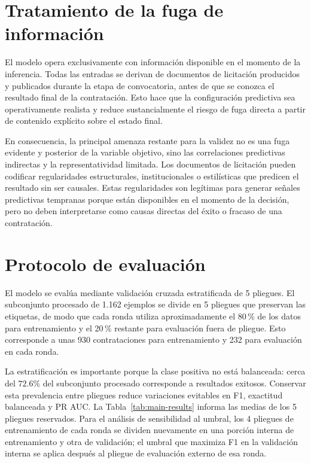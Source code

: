 \section{Tratamiento de la fuga de información}
El modelo opera exclusivamente con información disponible en el momento de la inferencia. Todas las entradas se derivan de documentos de licitación producidos y publicados durante la etapa de convocatoria, antes de que se conozca el resultado final de la contratación. Esto hace que la configuración predictiva sea operativamente realista y reduce sustancialmente el riesgo de fuga directa a partir de contenido explícito sobre el estado final.

En consecuencia, la principal amenaza restante para la validez no es una fuga evidente y posterior de la variable objetivo, sino las correlaciones predictivas indirectas y la representatividad limitada. Los documentos de licitación pueden codificar regularidades estructurales, institucionales o estilísticas que predicen el resultado sin ser causales. Estas regularidades son legítimas para generar señales predictivas tempranas porque están disponibles en el momento de la decisión, pero no deben interpretarse como causas directas del éxito o fracaso de una contratación.

\section{Protocolo de evaluación}
El modelo se evalúa mediante validación cruzada estratificada de 5 pliegues. El subconjunto procesado de 1.162 ejemplos se divide en 5 pliegues que preservan las etiquetas, de modo que cada ronda utiliza aproximadamente el 80\,\% de los datos para entrenamiento y el 20\,\% restante para evaluación fuera de pliegue. Esto corresponde a unas 930 contrataciones para entrenamiento y 232 para evaluación en cada ronda.

La estratificación es importante porque la clase positiva no está balanceada: cerca del $72.6\%$ del subconjunto procesado corresponde a resultados exitosos. Conservar esta prevalencia entre pliegues reduce variaciones evitables en F1, exactitud balanceada y PR AUC. La Tabla~\ref{tab:main-results} informa las medias de los 5 pliegues reservados. Para el análisis de sensibilidad al umbral, los 4 pliegues de entrenamiento de cada ronda se dividen nuevamente en una porción interna de entrenamiento y otra de validación; el umbral que maximiza F1 en la validación interna se aplica después al pliegue de evaluación externo de esa ronda.

